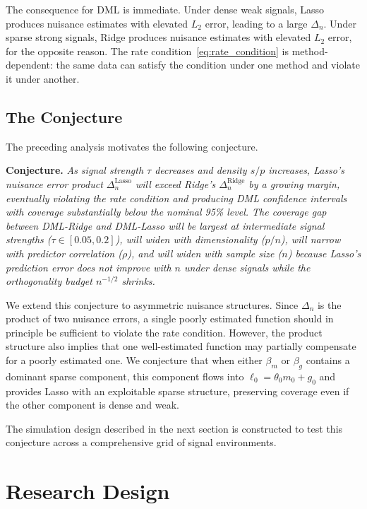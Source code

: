 \documentclass[a4paper,10.5pt]{article}
\begin{document}
The consequence for DML is immediate. Under dense weak signals, Lasso produces nuisance estimates with elevated $L_2$ error, leading to a large $\Delta_n$. Under sparse strong signals, Ridge produces nuisance estimates with elevated $L_2$ error, for the opposite reason. The rate condition~\eqref{eq:rate_condition} is method-dependent: the same data can satisfy the condition under one method and violate it under another.


\subsection{The Conjecture}\label{sec:conjecture}

The preceding analysis motivates the following conjecture.

\medskip
\noindent\textbf{Conjecture.} \textit{As signal strength $\tau$ decreases and density $s/p$ increases, Lasso's nuisance error product $\Delta_n^{\text{Lasso}}$ will exceed Ridge's $\Delta_n^{\text{Ridge}}$ by a growing margin, eventually violating the rate condition and producing DML confidence intervals with coverage substantially below the nominal 95\% level. The coverage gap between DML-Ridge and DML-Lasso will be largest at intermediate signal strengths ($\tau \in [0.05, 0.2]$), will widen with dimensionality ($p/n$), will narrow with predictor correlation ($\rho$), and will widen with sample size ($n$) because Lasso's prediction error does not improve with $n$ under dense signals while the orthogonality budget $n^{-1/2}$ shrinks.}
\medskip

We extend this conjecture to asymmetric nuisance structures. Since $\Delta_n$ is the product of two nuisance errors, a single poorly estimated function should in principle be sufficient to violate the rate condition. However, the product structure also implies that one well-estimated function may partially compensate for a poorly estimated one. We conjecture that when either $\beta_m$ or $\beta_g$ contains a dominant sparse component, this component flows into $\ell_0 = \theta_0 m_0 + g_0$ and provides Lasso with an exploitable sparse structure, preserving coverage even if the other component is dense and weak.

The simulation design described in the next section is constructed to test this conjecture across a comprehensive grid of signal environments.


\section{Research Design}\label{sec:design}
\end{document}
